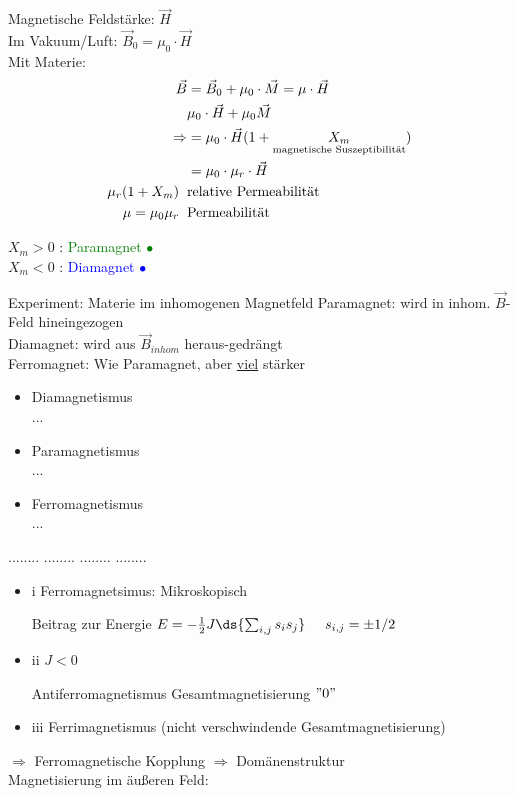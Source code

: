 \noindent Magnetische Feldstärke: $ \vec{H} $ \\
Im Vakuum/Luft: $ \vec{B}_0 = \mu_0 \cdot \vec{H} $\\
Mit Materie: 
\begin{align*}
\vec{B} &= \vec{B}_0 + \mu_0 \cdot \vec{M} = \mu \cdot \vec{H} \\
&\mu_0 \cdot \vec{H} + \mu_0 \vec{M} \\
\Rightarrow &= \mu_0 \cdot \vec{H} (1+\underset{\text{magnetische Suszeptibilität}}{X_m})\\
&=\mu_0 \cdot \mu_r \cdot \vec{H}\\
\mu_r(1+X_m) \hspace{2mm}&\text{relative Permeabilität}\\
\mu = \mu_0\mu_r \hspace{2mm} &\text{Permeabilität}
\end{align*}

\begin{center}
	$ X_m > 0 $ \hspace{5mm} : \textcolor{green}{Paramagnet $ \bullet $}\\
	$ X_m < 0 $ \hspace{5mm} : \textcolor{blue}{Diamagnet $ \bullet $}
\end{center}
\bild
Experiment: Materie im inhomogenen Magnetfeld
\bild
Paramagnet: wird in inhom. $ \vec{B} $-Feld hineingezogen\\
Diamagnet: wird aus $ \vec{B}_{inhom} $ heraus-gedrängt\\
Ferromagnet: Wie Paramagnet, aber \underline{viel} stärker\\
\begin{itemize}
	\item Diamagnetismus\\
	... 
	\item Paramagnetismus\\
	...
	\item Ferromagnetismus\\
	...
\end{itemize}




........
........
\newpage
........
........



\begin{itemize}
	\item i Ferromagnetsimus: Mikroskopisch \\
	\bild
	
	Beitrag zur Energie $ E= - \frac{1}{2}J \ds{\sum_{i,j} s_i s_j} \hspace{5mm} s_{i,j} = \pm 1/2 $ \\
	\item ii $ J<0 $ \\
	\bild
	
	Antiferromagnetismus
	Gesamtmagnetisierung $ "0" $
	\item iii
	\bild
	Ferrimagnetismus (nicht verschwindende Gesamtmagnetisierung)
\end{itemize}
$ \Rightarrow $ Ferromagnetische Kopplung $ \Rightarrow $ Domänenstruktur\\ \break
Magnetisierung im äußeren Feld:
\bild

